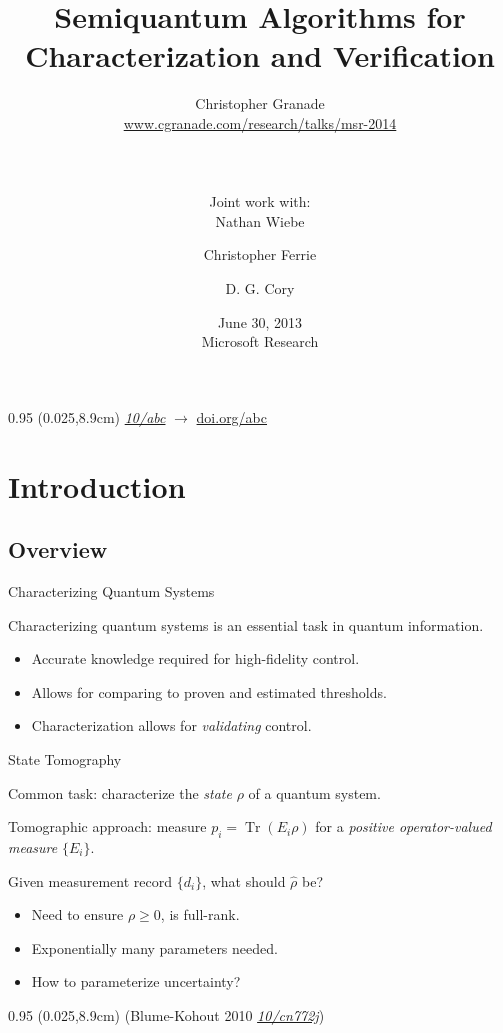\documentclass[xcolor=dvipsnames, compress]{beamer}
\title{Semiquantum Algorithms for Characterization and Verification}
\author[Granade, Wiebe, Ferrie and Cory]{
  Christopher Granade  \\
  {\tiny \url{www.cgranade.com/research/talks/msr-2014}} \\
  \rule{0.35\textwidth}{0.125pt}\\
  {\footnotesize Joint work with:}\\
  Nathan Wiebe \and
  Christopher Ferrie \and
  D. G. Cory
}
\institute[IQC]{
  Institute for Quantum Computing\\
  University of Waterloo, Ontario, Canada
}
\date[June 2014]{
  June 30, 2013 \\
  {\footnotesize Microsoft Research}
}
\renewcommand\UrlFont{\color{red}\rmfamily\itshape}
\newcommand{\shortdoi}[1]{\href{http://doi.org/#1}{\UrlFont 10/#1}}
\newcommand{\Tr}{\operatorname{Tr}}
\newcommand{\bottomnote}[1]{
  \begin{textblock*}{0.95\paperwidth} (0.025\paperwidth,8.9cm)
    {\tiny \hfill #1}
  \end{textblock*}
}
\begin{document}
\begin{frame}[plain]
  \titlepage
  \bottomnote{\shortdoi{abc} $\to$ \url{doi.org/abc}} 
\end{frame}

\section{Introduction}
\subsection{Overview}

\begin{frame}{Characterizing Quantum Systems}

  Characterizing quantum systems is an essential task in quantum information.

  \begin{itemize}
    \item Accurate knowledge required for high-fidelity control.
    \item Allows for comparing to proven and estimated thresholds.
    \item Characterization allows for \emph{validating} control.
  \end{itemize}

\end{frame}

\begin{frame}{State Tomography}

  Common task: characterize the \emph{state} $\rho$ of a quantum system.

  Tomographic approach: measure $p_i = \Tr(E_i\rho)$ for a \emph{positive operator-valued measure}
  $\{E_i\}$.


  Given measurement record $\{d_i\}$, what should $\hat{\rho}$ be?

  \begin{itemize}
    \item Need to ensure $\rho \ge 0$, is full-rank.
    \item Exponentially many parameters needed.
    \item How to parameterize uncertainty?
  \end{itemize}

  \bottomnote{(Blume-Kohout 2010 \shortdoi{cn772j})}

\end{frame}
\end{document}
